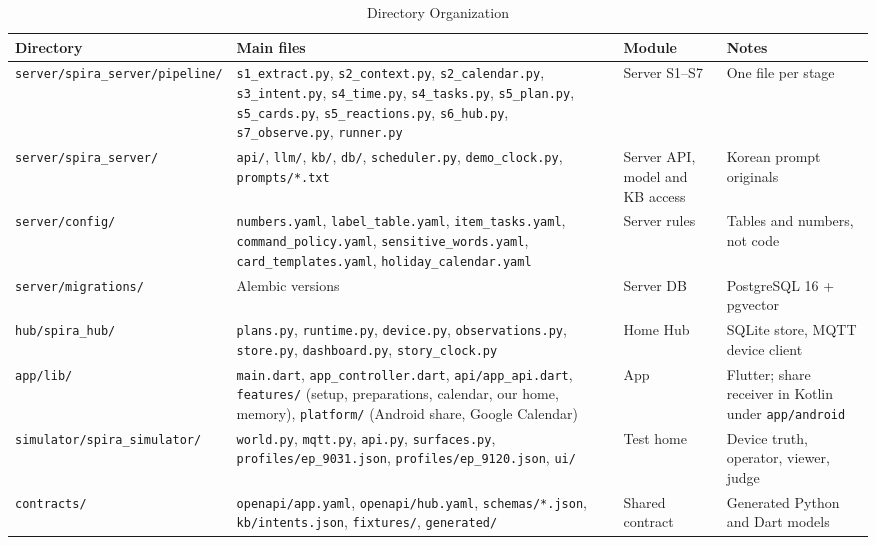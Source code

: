 \documentclass[conference]{IEEEtran}
\begin{document}
\begin{table}[!t]
\caption{Directory Organization}
\centering
\footnotesize
\setlength{\tabcolsep}{3pt}
\renewcommand{\arraystretch}{1.08}
\begin{tabularx}{\textwidth}{@{}L{0.20\textwidth}L{0.34\textwidth}L{0.13\textwidth}X@{}}
\toprule
\textbf{Directory} & \textbf{Main files} & \textbf{Module} & \textbf{Notes} \\
\midrule
\texttt{server/\allowbreak spira\_server/\allowbreak pipeline/} & \texttt{s1\_extract.py}, \texttt{s2\_context.py}, \texttt{s2\_calendar.py}, \texttt{s3\_intent.py}, \texttt{s4\_time.py}, \texttt{s4\_tasks.py}, \texttt{s5\_plan.py}, \texttt{s5\_cards.py}, \texttt{s5\_reactions.py}, \texttt{s6\_hub.py}, \texttt{s7\_observe.py}, \texttt{runner.py} & Server S1--S7 & One file per stage \\
\texttt{server/\allowbreak spira\_server/} & \texttt{api/}, \texttt{llm/}, \texttt{kb/}, \texttt{db/}, \texttt{scheduler.py}, \texttt{demo\_clock.py}, \texttt{prompts/*.txt} & Server API, model and KB access & Korean prompt originals \\
\texttt{server/config/} & \texttt{numbers.yaml}, \texttt{label\_table.yaml}, \texttt{item\_tasks.yaml}, \texttt{command\_policy.yaml}, \texttt{sensitive\_words.yaml}, \texttt{card\_templates.yaml}, \texttt{holiday\_calendar.yaml} & Server rules & Tables and numbers, not code \\
\texttt{server/\allowbreak migrations/} & Alembic versions & Server DB & PostgreSQL 16 + pgvector \\
\texttt{hub/\allowbreak spira\_hub/} & \texttt{plans.py}, \texttt{runtime.py}, \texttt{device.py}, \texttt{observations.py}, \texttt{store.py}, \texttt{dashboard.py}, \texttt{story\_clock.py} & Home Hub & SQLite store, MQTT device client \\
\texttt{app/lib/} & \texttt{main.dart}, \texttt{app\_controller.dart}, \texttt{api/app\_api.dart}, \texttt{features/} (setup, preparations, calendar, our home, memory), \texttt{platform/} (Android share, Google Calendar) & App & Flutter; share receiver in Kotlin under \texttt{app/android} \\
\texttt{simulator/\allowbreak spira\_simulator/} & \texttt{world.py}, \texttt{mqtt.py}, \texttt{api.py}, \texttt{surfaces.py}, \texttt{profiles/ep\_9031.json}, \texttt{profiles/ep\_9120.json}, \texttt{ui/} & Test home & Device truth, operator, viewer, judge \\
\texttt{contracts/} & \texttt{openapi/app.yaml}, \texttt{openapi/hub.yaml}, \texttt{schemas/*.json}, \texttt{kb/intents.json}, \texttt{fixtures/}, \texttt{generated/} & Shared contract & Generated Python and Dart models \\

\end{tabularx}
\end{table}
\end{document}
